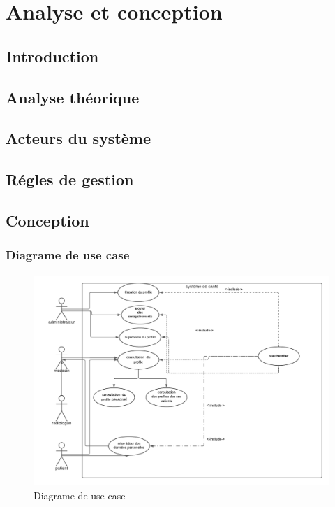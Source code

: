 \chapter{Analyse et conception}



\section{Introduction}

\section{Analyse théorique}

\section{Acteurs du système}

\section{Régles de gestion}

\section{Conception}

\subsection{Diagrame de use case}

\begin{figure}[!h]
\begin{center}
\includegraphics[height=8cm,width=18cm]{usecasediag.png}
\end{center}
\caption{Diagrame de use case}
\end{figure}

